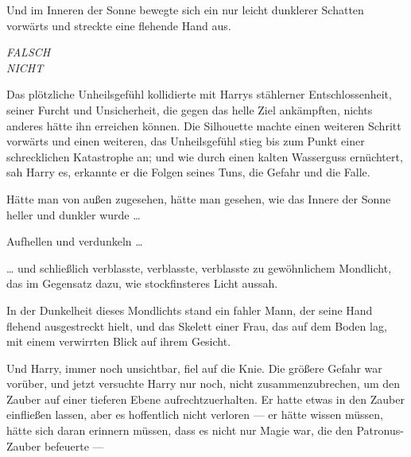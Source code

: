Und im Inneren der Sonne bewegte sich ein nur leicht dunklerer Schatten vorwärts und streckte eine flehende Hand aus.

\emph{FALSCH\\
NICHT}

Das plötzliche Unheilsgefühl kollidierte mit Harrys stählerner Entschlossenheit, seiner Furcht und Unsicherheit, die gegen das helle Ziel ankämpften, nichts anderes hätte ihn erreichen können. Die Silhouette machte einen weiteren Schritt vorwärts und einen weiteren, das Unheilsgefühl stieg bis zum Punkt einer schrecklichen Katastrophe an; und wie durch einen kalten Wasserguss ernüchtert, sah Harry es, erkannte er die Folgen seines Tuns, die Gefahr und die Falle.

Hätte man von außen zugesehen, hätte man gesehen, wie das Innere der Sonne heller und dunkler wurde …

Aufhellen und verdunkeln …

… und schließlich verblasste, verblasste, verblasste zu gewöhnlichem Mondlicht, das im Gegensatz dazu, wie stockfinsteres Licht aussah.

In der Dunkelheit dieses Mondlichts stand ein fahler Mann, der seine Hand flehend ausgestreckt hielt, und das Skelett einer Frau, das auf dem Boden lag, mit einem verwirrten Blick auf ihrem Gesicht.

Und Harry, immer noch unsichtbar, fiel auf die Knie. Die größere Gefahr war vorüber, und jetzt versuchte Harry nur noch, nicht zusammenzubrechen, um den Zauber auf einer tieferen Ebene aufrechtzuerhalten. Er hatte etwas in den Zauber einfließen lassen, aber es hoffentlich nicht verloren — er hätte wissen müssen, hätte sich daran erinnern müssen, dass es nicht nur Magie war, die den Patronus-Zauber befeuerte —

